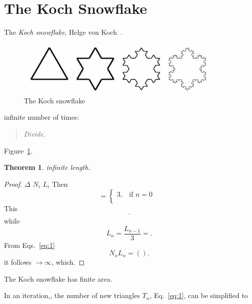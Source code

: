 \documentclass[12pt,a4paper]{article}
\newtheorem{theorem}{Theorem}
\begin{document}
\section{The Koch Snowflake}

The \emph{Koch snowflake},
Helge von Koch~\cite{koch}.  
\begin{figure}[h] \label{koch}
  \centering
  \includegraphics[width=10cm]{snowflake.jpg}
  \caption{The Koch snowflake }
\end{figure}
infinite number of times:
\begin{quote}
 \textit{Divide.}
\end{quote}
Figure~\ref{koch}.

\begin{theorem}
  infinite length. 
\end{theorem}
\begin{proof}
  $\Delta$
  $N_i$ 
  $L_i$
  Then
  \begin{displaymath}
    =
    \begin{cases}
      3, & \text{if $n=0$ } \\
    \end{cases}
  \end{displaymath}
  This 
  \begin{equation}
    \label{eq:1}
    \cdot
  \end{equation}
   while  
  \begin{equation}
    \label{eq:5}
    L_n = \frac{L_{n-1}}{3} =.
  \end{equation}
  From Eqs.~\ref{eq:1}  
  \begin{displaymath}
    N_nL_n =
    \left(      \right)
    .
  \end{displaymath}
  it follows $\to \infty$, which.
\end{proof}

  The Koch snowflake has finite area. 

  
  In an iteration,, the number of new triangles $T_n$,
    Eq.~\ref{eq:1}, can be simplified to 

    \label{eq:2}
\end{document}
